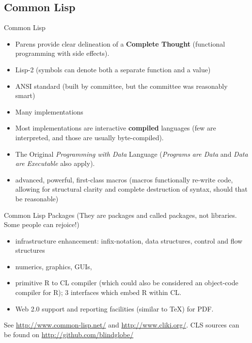 \documentclass{beamer}
\begin{document}
\subsection{Common Lisp}
\label{sec:CLS:lisp}

\begin{frame}{Common Lisp}
  \begin{itemize}
  \item Parens provide clear delineation of a \textbf{Complete
      Thought} (functional programming with side effects).
  \item Lisp-2 (symbols can denote both a separate function and a value)
  \item ANSI standard (built by committee, but the committee was
    reasonably smart)
  \item Many implementations
  \item Most implementations are interactive \textbf{compiled}
    languages (few are interpreted, and those are usually
    byte-compiled).
  \item The Original \emph{Programming with Data} Language
    (\emph{Programs are Data} and \emph{Data are Executable} also
    apply).
  \item advanced, powerful, first-class macros (macros functionally
    re-write code, allowing for structural clarity and complete
    destruction of syntax, should that be reasonable)
  \end{itemize}
\end{frame}

\begin{frame}{Common Lisp Packages}
  (They are packages and called packages, not libraries.  Some people
  can rejoice!)
  \begin{itemize}
  \item infrastructure enhancement:  infix-notation, data structures,
    control and flow structures
  \item numerics, graphics, GUIs, 
  \item primitive R to CL compiler (which could also be considered an
    object-code compiler for R); 3 interfaces which embed R within CL.
  \item Web 2.0 support and reporting facilities (similar to TeX) for PDF.
  \end{itemize}
  See \url{http://www.common-lisp.net/} and
  \url{http://www.cliki.org/}.  CLS sources can be found on
  \url{http://github.com/blindglobe/}
\end{frame}
\end{document}
